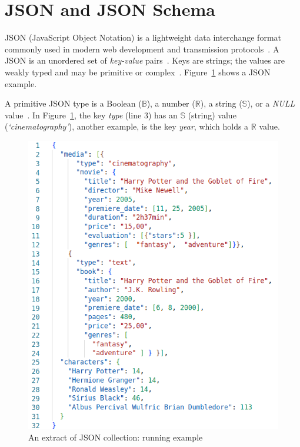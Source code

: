 
\section{JSON and JSON Schema}
  \label{sec:prelim}

JSON (JavaScript Object Notation) is a lightweight data interchange format commonly used in modern web development and transmission protocols~\citep{bourhis2017json, Pezoa16, peng2011using}. 
A JSON is an unordered set of \textit{key-value} pairs~\citep{peng2011using}. Keys are strings; the values are weakly typed and may be primitive or complex~\citep{baazizi2019parametric}. Figure~\ref{fig:JSONEx} shows a JSON example.

A primitive JSON type is a Boolean ($\mathbb{B}$), a number ($\mathbb{R}$), a string ($\mathbb{S}$), or a \textit{NULL} value~\citep{bourhis2017json}. In Figure~\ref{fig:JSONEx}, the key \textit{type} (line 3) has an  $\mathbb{S}$ (string) value (\textit{`cinematography'}), another example, is the key \textit{year}, which  holds a $\mathbb{R}$ value. 


\begin{figure}[ht]
    \centering
    \includegraphics[scale=.45]{Figures/JSONExampleNew.png}
    \caption{An extract of JSON collection: running example}
    \label{fig:JSONEx}
\end{figure}



